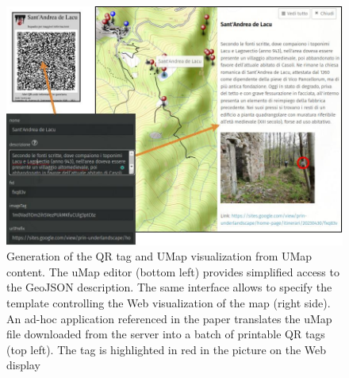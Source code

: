 \documentclass[sustainability,article,submit,pdftex,moreauthors]{Definitions/mdpi}
\begin{document}
\begin{figure}
\includegraphics[width =\linewidth]{figure/combo_gen.jpeg}
\caption{Generation of the QR tag and UMap visualization from UMap content. The uMap editor (bottom left) provides simplified access to the GeoJSON description. The same interface allows to specify the template controlling the Web visualization of the map (right side). An ad-hoc application referenced in the paper translates the uMap file downloaded from the server into a batch of printable QR tags (top left). The tag is highlighted in red in the picture on the Web display \label{fig:editing}}
\end{figure}
\end{document}
